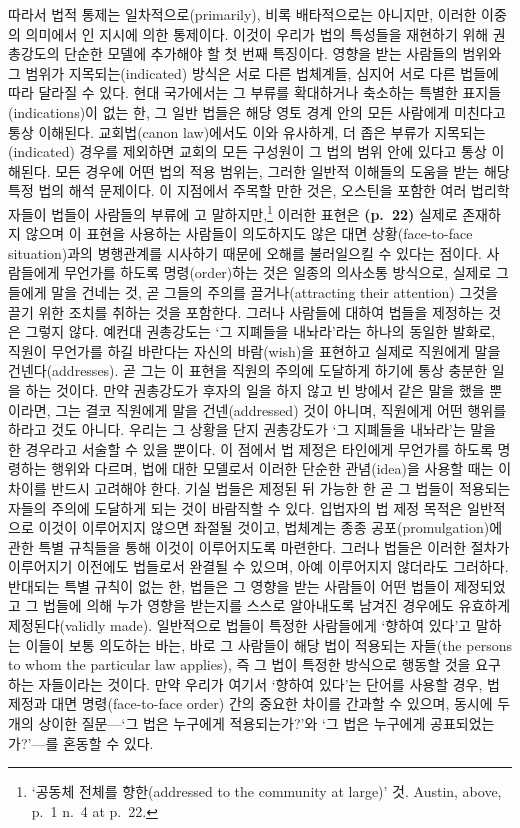 따라서 법적 통제는 일차적으로(primarily), 비록 배타적으로는 아니지만,
이러한 이중의 의미에서 인 지시에 의한 통제이다.
이것이 우리가 법의 특성들을 재현하기 위해 권총강도의 단순한 모델에
추가해야 할 첫 번째 특징이다. 영향을 받는 사람들의 범위와 그 범위가
지목되는(indicated) 방식은 서로 다른 법체계들, 심지어 서로 다른 법들에
따라 달라질 수 있다. 현대 국가에서는 그 부류를 확대하거나 축소하는
특별한 표지들(indications)이 없는 한, 그 일반 법들은 해당 영토 경계 안의
모든 사람에게 미친다고 통상 이해된다. 교회법(canon law)에서도 이와
유사하게, 더 좁은 부류가 지목되는(indicated) 경우를 제외하면 교회의 모든
구성원이 그 법의 범위 안에 있다고 통상 이해된다. 모든 경우에 어떤 법의
적용 범위는, 그러한 일반적 이해들의 도움을 받는 해당 특정 법의 해석
문제이다. 이 지점에서 주목할 만한 것은, 오스틴을 포함한 여러
법리학자들이 법들이 사람들의 부류에 고
말하지만,\footnote{‘공동체 전체를 향한(addressed to the community at
  large)’ 것. Austin, above, p.~1 n.~4 at p.~22.} 이러한 표현은
\textbf{(p.~22)} 실제로 존재하지 않으며 이 표현을 사용하는 사람들이
의도하지도 않은 대면 상황(face-to-face situation)과의 병행관계를
시사하기 때문에 오해를 불러일으킬 수 있다는 점이다. 사람들에게 무언가를
하도록 명령(order)하는 것은 일종의 의사소통 방식으로, 실제로 그들에게
말을 건네는 것, 곧 그들의 주의를 끌거나(attracting their attention)
그것을 끌기 위한 조치를 취하는 것을 포함한다. 그러나 사람들에 대하여
법들을 제정하는 것은 그렇지 않다. 예컨대 권총강도는 ‘그 지폐들을
내놔라’라는 하나의 동일한 발화로, 직원이 무언가를 하길 바란다는 자신의
바람(wish)을 표현하고 실제로 직원에게 말을 건넨다(addresses). 곧 그는 이
표현을 직원의 주의에 도달하게 하기에 통상 충분한 일을 하는 것이다. 만약
권총강도가 후자의 일을 하지 않고 빈 방에서 같은 말을 했을 뿐이라면, 그는
결코 직원에게 말을 건넨(addressed) 것이 아니며, 직원에게 어떤 행위를
하라고  것도 아니다. 우리는 그 상황을 단지
권총강도가 ‘그 지폐들을 내놔라’는 말을 한 경우라고 서술할 수 있을
뿐이다. 이 점에서 법 제정은 타인에게 무언가를 하도록 명령하는 행위와
다르며, 법에 대한 모델로서 이러한 단순한 관념(idea)을 사용할 때는 이
차이를 반드시 고려해야 한다. 기실 법들은 제정된 뒤 가능한 한 곧 그
법들이 적용되는 자들의 주의에 도달하게 되는 것이 바람직할 수 있다.
입법자의 법 제정 목적은 일반적으로 이것이 이루어지지 않으면 좌절될
것이고, 법체계는 종종 공포(promulgation)에 관한 특별 규칙들을 통해
이것이 이루어지도록 마련한다. 그러나 법들은 이러한 절차가 이루어지기
이전에도 법들로서 완결될 수 있으며, 아예 이루어지지 않더라도 그러하다.
반대되는 특별 규칙이 없는 한, 법들은 그 영향을 받는 사람들이 어떤 법들이
제정되었고 그 법들에 의해 누가 영향을 받는지를 스스로 알아내도록 남겨진
경우에도 유효하게 제정된다(validly made). 일반적으로 법들이 특정한
사람들에게 ‘향하여 있다’고 말하는 이들이 보통 의도하는 바는, 바로 그
사람들이 해당 법이 적용되는 자들(the persons to whom the particular law
applies), 즉 그 법이 특정한 방식으로 행동할 것을 요구하는 자들이라는
것이다. 만약 우리가 여기서 ‘향하여 있다’는 단어를 사용할 경우, 법 제정과
대면 명령(face-to-face order) 간의 중요한 차이를 간과할 수 있으며,
동시에 두 개의 상이한 질문---‘그 법은 누구에게 적용되는가?’와 ‘그 법은
누구에게 공표되었는가?’---를 혼동할 수 있다.


